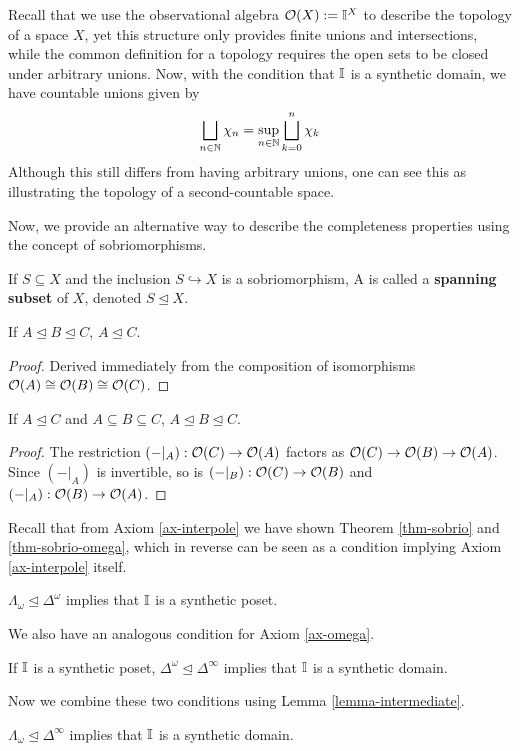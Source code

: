 Recall that we use the observational algebra $\mathcal{O}(X):=\mathbb{I}^X$ to describe the topology of a space $X$, yet this structure only provides finite unions and intersections, while the common definition for a topology requires the open sets to be closed under arbitrary unions. Now, with the condition that $\mathbb{I}$ is a synthetic domain, we have countable unions given by
$$\bigsqcup_{n\in\mathbb{N}}\chi_n=\sup_{n\in\mathbb{N}}\bigsqcup_{k=0}^n\chi_k$$
Although this still differs from having arbitrary unions, one can see this as illustrating the topology of a second-countable space.

Now, we provide an alternative way to describe the completeness properties using the concept of sobriomorphisms.
\begin{definition}
    If $S\subseteq X$ and the inclusion $S\hookrightarrow X$ is a sobriomorphism, A is called a \textbf{spanning subset} of $X$, denoted $S\unlhd X$.
\end{definition}
\begin{lemma}
    If $A\unlhd B\unlhd C$, $A\unlhd C$.
\end{lemma}
\begin{proof}
    Derived immediately from the composition of isomorphisms $\mathcal{O}(A)\cong\mathcal{O}(B)\cong\mathcal{O}(C)$.
\end{proof}
\begin{lemma}
    \label{lemma-intermediate}
    If $A\unlhd C$ and $A\subseteq B\subseteq C$, $A\unlhd B\unlhd C$.
\end{lemma}
\begin{proof}
    The restriction $(-|_A):\mathcal{O}(C)\to\mathcal{O}(A)$ factors as $\mathcal{O}(C)\to\mathcal{O}(B)\to\mathcal{O}(A)$. Since $(-|_A)$ is invertible, so is $(-|_B):\mathcal{O}(C)\to\mathcal{O}(B)$ and $(-|_A):\mathcal{O}(B)\to\mathcal{O}(A)$.
\end{proof}
Recall that from Axiom \ref{ax-interpole} we have shown Theorem \ref{thm-sobrio} and \ref{thm-sobrio-omega}, which in reverse can be seen as a condition implying Axiom \ref{ax-interpole} itself.
\begin{lemma}
    $\Lambda_\omega\unlhd\Delta^\omega$ implies that $\mathbb{I}$ is a synthetic poset.
\end{lemma}
We also have an analogous condition for Axiom \ref{ax-omega}.
\begin{lemma}
    If $\mathbb{I}$ is a synthetic poset, $\Delta^\omega\unlhd\Delta^\infty$ implies that $\mathbb{I}$ is a synthetic domain.
\end{lemma}
Now we combine these two conditions using Lemma \ref{lemma-intermediate}.
\begin{theorem}
    \label{thm-last}
    $\Lambda_\omega\unlhd\Delta^\infty$ implies that $\mathbb{I}$ is a synthetic domain.
\end{theorem}
